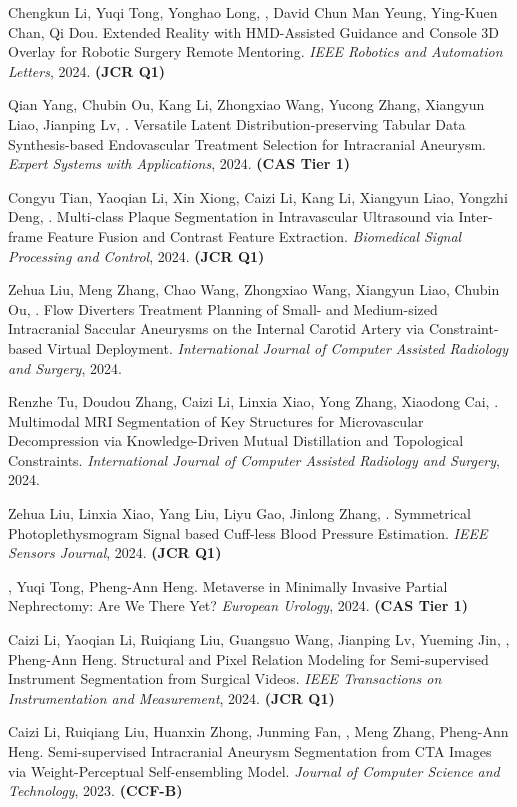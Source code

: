 \documentclass[a4paper,12pt,english]{curve}
\begin{document}
\begin{small}
\begin{publist}
\item Chengkun Li, Yuqi Tong, Yonghao Long, \WS, David Chun Man Yeung, Ying-Kuen Chan, Qi Dou. Extended Reality with HMD-Assisted Guidance and Console 3D Overlay for Robotic Surgery Remote Mentoring. \emph{IEEE Robotics and Automation Letters}, 2024. \textbf{(JCR Q1)}
\item Qian Yang, Chubin Ou, Kang Li, Zhongxiao Wang, Yucong Zhang, Xiangyun Liao, Jianping Lv, \WS\CORR. Versatile Latent Distribution-preserving Tabular Data Synthesis-based Endovascular Treatment Selection for Intracranial Aneurysm. \emph{Expert Systems with Applications}, 2024. \textbf{(CAS Tier 1)}
\item Congyu Tian, Yaoqian Li, Xin Xiong, Caizi Li, Kang Li, Xiangyun Liao, Yongzhi Deng, \WS\CORR. Multi-class Plaque Segmentation in Intravascular Ultrasound via Inter-frame Feature Fusion and Contrast Feature Extraction. \emph{Biomedical Signal Processing and Control}, 2024. \textbf{(JCR Q1)}
\item Zehua Liu\EQA, Meng Zhang\EQA, Chao Wang, Zhongxiao Wang, Xiangyun Liao, Chubin Ou\CORR, \WS\CORR. Flow Diverters Treatment Planning of Small- and Medium-sized Intracranial Saccular Aneurysms on the Internal Carotid Artery via Constraint-based Virtual Deployment. \emph{International Journal of Computer Assisted Radiology and Surgery}, 2024.
\item Renzhe Tu\EQA, Doudou Zhang\EQA, Caizi Li\CORR, Linxia Xiao, Yong Zhang, Xiaodong Cai, \WS\CORR. Multimodal MRI Segmentation of Key Structures for Microvascular Decompression via Knowledge-Driven Mutual Distillation and Topological Constraints. \emph{International Journal of Computer Assisted Radiology and Surgery}, 2024.
\item Zehua Liu, Linxia Xiao, Yang Liu, Liyu Gao, Jinlong Zhang, \WS\CORR. Symmetrical Photoplethysmogram Signal based Cuff-less Blood Pressure Estimation. \emph{IEEE Sensors Journal}, 2024. \textbf{(JCR Q1)}
\item \WS\CORR, Yuqi Tong, Pheng-Ann Heng. Metaverse in Minimally Invasive Partial Nephrectomy: Are We There Yet? \emph{European Urology}, 2024. \textbf{(CAS Tier 1)}
\item Caizi Li, Yaoqian Li, Ruiqiang Liu, Guangsuo Wang, Jianping Lv, Yueming Jin, \WS\CORR, Pheng-Ann Heng. Structural and Pixel Relation Modeling for Semi-supervised Instrument Segmentation from Surgical Videos. \emph{IEEE Transactions on Instrumentation and Measurement}, 2024. \textbf{(JCR Q1)}
\item Caizi Li, Ruiqiang Liu, Huanxin Zhong, Junming Fan, \WS\CORR, Meng Zhang, Pheng-Ann Heng. Semi-supervised Intracranial Aneurysm Segmentation from CTA Images via Weight-Perceptual Self-ensembling Model. \emph{Journal of Computer Science and Technology}, 2023. \textbf{(CCF-B)}

\end{publist}
\end{small}
\end{document}
